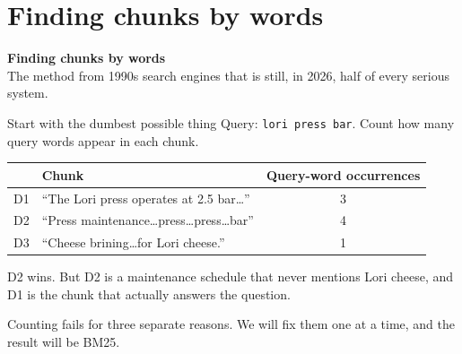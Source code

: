 \documentclass[aspectratio=169]{beamer}
\newcommand{\watchbox}[1]{%
  \begin{tcolorbox}[colback=armorange!12, colframe=armorange, boxrule=0.6pt, arc=2pt]
  #1
  \end{tcolorbox}}
\newcommand{\sectiontransition}[2]{%
  \begin{frame}[plain]
    \vfill
    \begin{center}
      {\Huge\bfseries\color{popblue} #1}\\[1.1em]
      {\large #2}
    \end{center}
    \vfill
  \end{frame}}
\begin{document}
\section{Finding chunks by words}
\sectiontransition{Finding chunks by words}{The method from 1990s search engines that is
still, in 2026, half of every serious system.}

\begin{frame}{Start with the dumbest possible thing}
  \vspace{0.6em}
  Query: \texttt{lori press bar}. Count how many query words appear in each chunk.

  \vspace{0.9em}
  \begin{center}
  \small
  \begin{tabular}{clc}
    \toprule
    & \textbf{Chunk} & \textbf{Query-word occurrences} \\
    \midrule
    D1 & ``The Lori press operates at 2.5 bar\ldots''            & 3 \\
    D2 & ``Press maintenance\ldots press\ldots press\ldots bar'' & 4 \\
    D3 & ``Cheese brining\ldots for Lori cheese.''               & 1 \\
    \bottomrule
  \end{tabular}
  \end{center}

  \vspace{1.0em}
  D2 wins. But D2 is a maintenance schedule that never mentions Lori cheese, and D1 is the
  chunk that actually answers the question.

  \vspace{0.7em}
  \watchbox{Counting fails for three separate reasons. We will fix them one at a time, and
  the result will be BM25.}
\end{frame}
\end{document}
